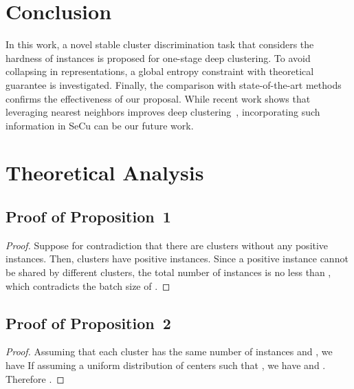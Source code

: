 \documentclass[10pt,twocolumn,letterpaper]{article}
\begin{document}
\section{Conclusion}
In this work, a novel stable cluster discrimination task that considers the hardness of instances is proposed for one-stage deep clustering. To avoid collapsing in representations, a global entropy constraint with theoretical guarantee is investigated. Finally, the comparison with state-of-the-art methods confirms the effectiveness of our proposal. While recent work shows that leveraging nearest neighbors improves deep clustering~\cite{DangD0WH21, GansbekeVGPG20,ZhongW0HDNL021}, incorporating such information in SeCu can be our future work.


{\small


}
\appendix
\section{Theoretical Analysis}
\subsection{Proof of Proposition~1}
\begin{proof}
Suppose for contradiction that there are  clusters without any positive instances. Then,  clusters have positive instances. Since a positive instance cannot be shared by different clusters, the total number of instances is no less than , which contradicts the batch size of .
\end{proof}
\subsection{Proof of Proposition~2}
\begin{proof}
Assuming that each cluster has the same number of instances and , we have
{\small
}
If assuming a uniform distribution of centers such that , we have  and
. Therefore 
.
\end{proof}
\end{document}
